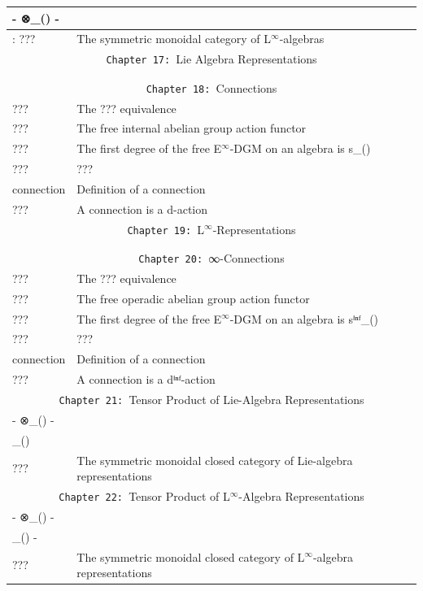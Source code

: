 \documentclass{book}
\theoremstyle{definition}
\begin{document}
{\begin{longtable}{|| l || l ||}
\hline \hline
- ⊗\_() - & \\ 
 \hline
 : ??? & The symmetric monoidal category of L${}^{\infty}$-algebras \\
 \hline \hline
\multicolumn{2}{||c||}{\texttt{Chapter 17: }Lie Algebra Representations} \\
\hline \hline
 & \\
\hline
 & \\
\hline \hline
\multicolumn{2}{||c||}{\texttt{Chapter 18: }Connections} \\
\hline \hline
??? & The ??? equivalence \\
\hline
??? & The free internal abelian group action functor \\
\hline
??? & The first degree of the free E${}^{\infty}$-DGM on an algebra is s\_() \\
\hline
???   & ??? \\
\hline
connection & Definition of a connection \\
\hline
??? & A connection is a d-action \\
\hline \hline
\multicolumn{2}{||c||}{\texttt{Chapter 19: }L${}^{\infty}$-Representations} \\
\hline \hline
 & \\
\hline
 & \\
\hline \hline
\multicolumn{2}{||c||}{\texttt{Chapter 20: }∞-Connections} \\
\hline \hline
??? & The ??? equivalence \\
\hline
??? & The free operadic abelian group action functor \\
\hline
??? & The first degree of the free E${}^{\infty}$-DGM on an algebra is sⁱⁿᶠ\_() \\
\hline
???  & ??? \\
\hline
connection & Definition of a connection \\
\hline
??? & A connection is a dⁱⁿᶠ-action\\
\hline \hline
\multicolumn{2}{||c||}{\texttt{Chapter 21: }Tensor Product of Lie-Algebra Representations} \\
\hline \hline
- ⊗\_() - &  \\
\hline
[-,-]\_() &  \\
\hline
??? & The symmetric monoidal closed category of Lie-algebra representations \\
\hline \hline
\multicolumn{2}{||c||}{\texttt{Chapter 22: }Tensor Product of L${}^{\infty}$-Algebra Representations} \\
\hline \hline
- ⊗\_() -  &  \\
 \hline
[-,-]\_() - &  \\
 \hline
??? & The symmetric monoidal closed category of L${}^{\infty}$-algebra representations\\
 \hline \hline
\end{longtable}
}
\end{document}
